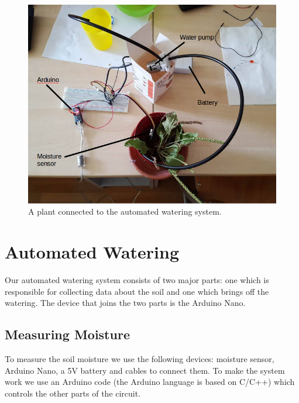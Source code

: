 \documentclass[conference]{IEEEtran}
\begin{document}
\begin{figure}
    \centering
    \includegraphics[width=\columnwidth]{prototype}
    \caption{A plant connected to the automated watering system.}
    \label{fig:prototype}
\end{figure}

\section{Automated Watering}
\label{sec:automated}

Our automated watering system consists of two major parts:
one which is responsible for collecting data about the soil and one which brings off the watering.
The device that joins the two parts is the Arduino Nano.

\subsection{Measuring Moisture}


To measure the soil moisture we use the following devices:
moisture sensor, Arduino Nano, a 5V battery and cables to connect them.
To make the system work we use an Arduino code (the Arduino language is based on C/C++) which controls the other parts of the circuit.

\end{document}
